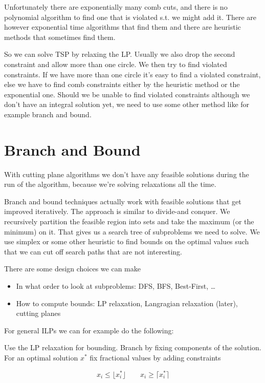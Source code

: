 Unfortunately there are exponentially many comb cuts, and there is no polynomial algorithm to find one that is violated s.t. we might add it. There are however exponential time algorithms that find them and there are heuristic methods that sometimes find them.

So we can solve TSP by relaxing the LP. Usually we also drop the second constraint and allow more than one circle. We then try to find violated constraints. If we have more than one circle it's easy to find a violated constraint, else we have to find comb constraints either by the heuristic method or the exponential one. Should we be unable to find violated constraints although we don't have an integral solution yet, we need to use some other method like for example branch and bound.

\section{Branch and Bound}

With cutting plane algorithms we don't have any feasible solutions during the run of the algorithm, because we're solving relaxations all the time.

Branch and bound techniques actually work with feasible solutions that get improved iteratively. The approach is similar to divide-and conquer. We recursively partition the feasible region into sets and take the maximum (or the minimum) on it. That gives us a search tree of subproblems we need to solve. We use simplex or some other heuristic to find bounds on the optimal values such that we can cut off search paths that are not interesting.

There are some design choices we can make

\begin{itemize}
\item In what order to look at subproblems: DFS, BFS, Best-First, \ldots
\item How to compute bounds: LP relaxation, Langragian relaxation (later), cutting planes
\end{itemize}

For general ILPs we can for example do the following: 

Use the LP relaxation for bounding. Branch by fixing components of the solution. For an optimal solution $x^*$ fix fractional values by adding constraints

\[x_i\leq  \lfloor x_i^*\rfloor \qquad x_i \geq \lceil x_i^* \rceil\]

